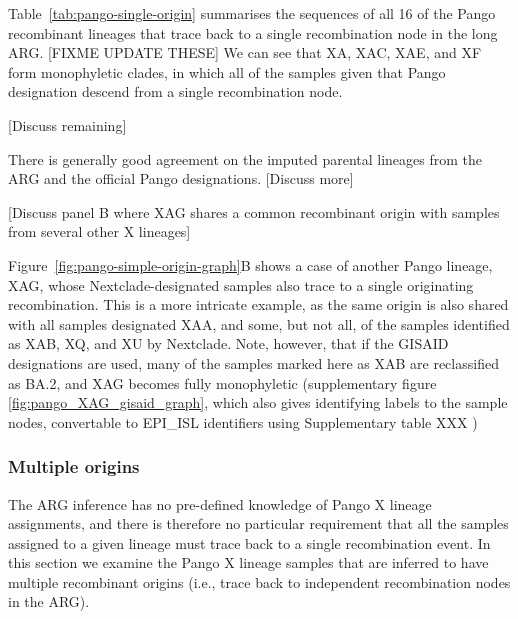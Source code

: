 \documentclass{article}
\begin{document}
Table~\ref{tab:pango-single-origin} summarises the sequences of all 16 of the
Pango recombinant lineages that trace back to a single recombination node in
the long ARG. [FIXME UPDATE THESE] We can see that XA, XAC, XAE, and XF form
monophyletic clades, in which all of the samples given that Pango designation
descend from a single recombination node.

[Discuss remaining]

There is generally good agreement on the imputed parental lineages from the ARG
and the official Pango designations. [Discuss more]

[Discuss panel B where XAG shares a common recombinant origin with samples from
several other X lineages]

Figure~\ref{fig:pango-simple-origin-graph}B shows a case of another
Pango lineage, XAG, whose Nextclade-designated samples also trace to a
single originating recombination. This is a more intricate example, as the same origin
is also shared with all samples designated XAA, and some, but not all, of the
samples identified as XAB, XQ, and XU by Nextclade. Note, however, that if the GISAID
designations are used, many of the samples marked here as XAB are reclassified
as BA.2, and XAG becomes fully monophyletic (supplementary figure
\ref{fig:pango_XAG_gisaid_graph}, which also gives identifying labels to the
sample nodes, convertable to EPI\_ISL identifiers using
Supplementary table XXX )

\subsubsection{Multiple origins}
The ARG inference has no pre-defined knowledge
of Pango X lineage assignments, and there is therefore no particular
requirement that all the samples assigned to a given lineage must trace back to
a single recombination event. In this section we examine the Pango X lineage
samples that are inferred to have multiple recombinant origins (i.e., trace
back to independent recombination nodes in the ARG).
\end{document}
